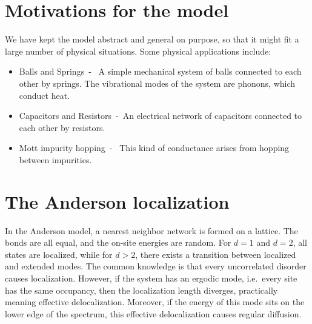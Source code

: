 \section{Motivations for the model}

We have kept the model abstract and general on purpose, so that it
might fit a large number of physical situations. Some physical applications include:
%
\begin{itemize}
  \item
    Balls and Springs\ - \ A simple mechanical system of balls connected to each
      other by springs. The vibrational modes of the system are phonons, which conduct heat.
  \item
    Capacitors and Resistors\ -\ An electrical network of capacitors connected to each other
      by resistors.
  \item 
    Mott impurity hopping\ - \ This kind of conductance arises from hopping 
      between impurities.
\end{itemize}


\section{The Anderson localization}\label{sec:anderson}

In the Anderson model\cite{anderson_absence_1958}, a nearest neighbor network is formed
on a lattice. The bonds are all equal, and the on-site energies are random.
For $d=1$ and $d=2$, all states are localized, while for $d>2$, there exists
a transition between localized and extended modes. The common knowledge
is that every uncorrelated disorder causes localization. However, if the system
has an ergodic mode, i.e.\ every site has the same occupancy, then the localization length 
diverges, practically meaning effective delocalization. Moreover, if the energy
of this mode sits on the lower edge of the spectrum, this effective delocalization 
causes regular diffusion.


%
%



